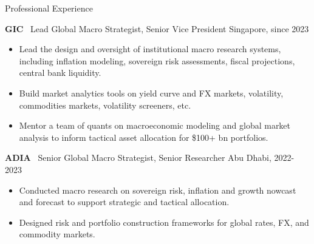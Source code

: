 \documentclass[usegeometry, 10pt, a4paper]{cv} %
\newcommand{\activite}[1]{\textbf{#1}\ }
\begin{document}
\begin{rubriquetableau}[0.95\textwidth]{Professional Experience}\\
\vspace{-0.5cm}

\activite{GIC} Lead Global Macro Strategist, Senior Vice President \hfill Singapore, since 2023 \\ 
\vspace{-0.4cm}
\begin{itemize}
  \item Lead the design and oversight of institutional macro research systems, including inflation modeling, sovereign risk assessments, fiscal projections, central bank liquidity.
  \item Build market analytics tools on yield curve and FX markets, volatility, commodities markets, volatility screeners, etc. 
  \item Mentor a team of quants on macroeconomic modeling and global market analysis to inform tactical asset allocation for \$100+ bn portfolios.
\end{itemize} 

\vspace{0.4cm}

\activite{ADIA} Senior Global Macro Strategist, Senior Researcher \hfill Abu Dhabi, 2022-2023 \\ 
\vspace{-0.2cm}
\begin{itemize}[]
\item Conducted macro research on sovereign risk, inflation and growth nowcast and forecast to support strategic and tactical allocation.
\item Designed risk and portfolio construction frameworks for global rates, FX, and commodity markets.
 \end{itemize}
 
\vspace{0.4cm}


\end{rubriquetableau}
\end{document}
